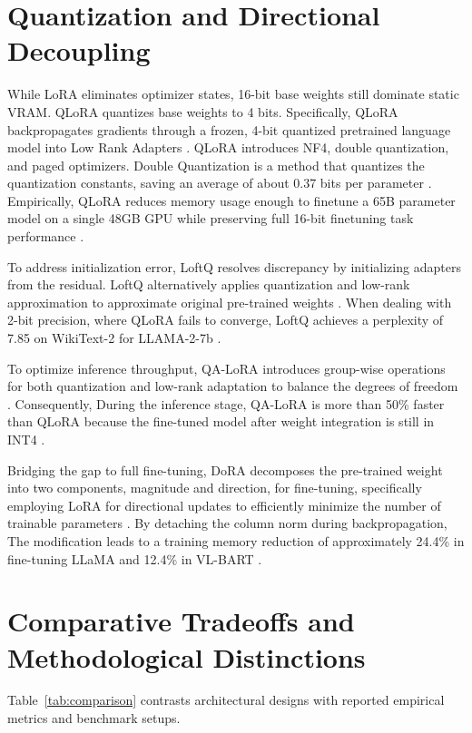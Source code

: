 \documentclass[11pt,a4paper]{article}
\begin{document}
\section{Quantization and Directional Decoupling}
While LoRA eliminates optimizer states, 16-bit base weights still dominate static VRAM. QLoRA quantizes base weights to 4 bits. Specifically, QLoRA backpropagates gradients through a frozen, 4-bit quantized pretrained language model into Low Rank Adapters \cite{dettmers2023qlora}. QLoRA introduces NF4, double quantization, and paged optimizers. Double Quantization is a method that quantizes the quantization constants, saving an average of about 0.37 bits per parameter \cite{dettmers2023qlora}. Empirically, QLoRA reduces memory usage enough to finetune a 65B parameter model on a single 48GB GPU while preserving full 16-bit finetuning task performance \cite{dettmers2023qlora}.

To address initialization error, LoftQ resolves discrepancy by initializing adapters from the residual. LoftQ alternatively applies quantization and low-rank approximation to approximate original pre-trained weights \cite{li2023loftq}. When dealing with 2-bit precision, where QLoRA fails to converge, LoftQ achieves a perplexity of 7.85 on WikiText-2 for LLAMA-2-7b \cite{li2023loftq}.

To optimize inference throughput, QA-LoRA introduces group-wise operations for both quantization and low-rank adaptation to balance the degrees of freedom \cite{xu2023qa}. Consequently, During the inference stage, QA-LoRA is more than 50\% faster than QLoRA because the fine-tuned model after weight integration is still in INT4 \cite{xu2023qa}.

Bridging the gap to full fine-tuning, DoRA decomposes the pre-trained weight into two components, magnitude and direction, for fine-tuning, specifically employing LoRA for directional updates to efficiently minimize the number of trainable parameters \cite{liu2024dora}. By detaching the column norm during backpropagation, The modification leads to a training memory reduction of approximately 24.4\% in fine-tuning LLaMA and 12.4\% in VL-BART \cite{liu2024dora}.

\section{Comparative Tradeoffs and Methodological Distinctions}
Table~\ref{tab:comparison} contrasts architectural designs with reported empirical metrics and benchmark setups.
\end{document}
